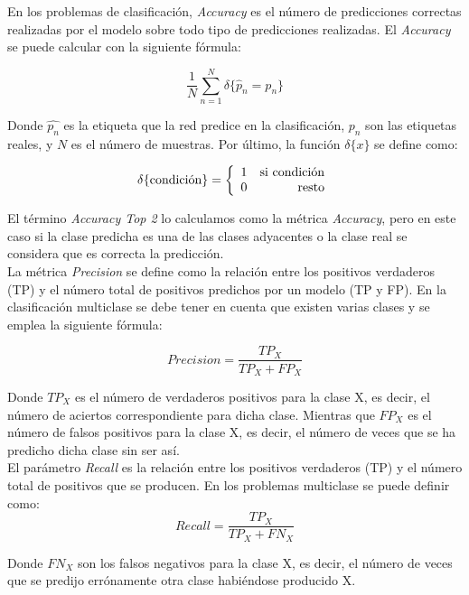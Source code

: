 En los problemas de clasificación, \textit{Accuracy} es el número de predicciones correctas realizadas por el modelo sobre todo tipo de predicciones realizadas. El \textit{Accuracy} se puede calcular con la siguiente fórmula:

$$\frac{1}{N} \sum\limits_{n=1}^N \delta\{ \hat{p}_n = p_n \}$$
\vspace{10pt}

Donde $\hat{p_n}$ es la etiqueta que la red predice en la clasificación, $p_n$ son las etiquetas reales, y $N$ es el número de muestras. Por último, la función $\delta\{x\}$ se define como:

$$\delta\{ \textup{condición}\} = \left\{ \begin{array}{lr} 1 &  \textup{si condición} \\ 0 & \mbox{resto} \end{array} \right.$$
\vspace{10pt}

El término \textit{Accuracy Top 2} lo calculamos como la métrica \textit{Accuracy}, pero en este caso si la clase predicha es una de las clases adyacentes o la clase real se considera que es correcta la predicción.\\

La métrica \textit{Precision} se define como la relación entre los positivos verdaderos (TP) y el número total de positivos predichos por un modelo (TP y FP). En la clasificación multiclase se debe tener en cuenta que existen varias clases y se emplea la siguiente fórmula:

 
\[ Precision = \frac{TP_X}{TP_X + FP_X} \]
\vspace{10pt}

Donde \(TP_X\) es el número de verdaderos positivos para la clase X, es decir, el número de aciertos correspondiente para dicha clase. Mientras que \(FP_X\) es el número de falsos positivos para la clase X, es decir, el número de veces que se ha predicho dicha clase sin ser así.\\


El parámetro \textit{Recall} es la relación entre los positivos verdaderos (TP) y el número total de positivos que se producen. En los problemas multiclase se puede definir como:\\

\[ Recall = \frac{TP_X}{TP_X + FN_X} \]
\vspace{10pt}

Donde \(FN_X\) son los falsos negativos para la clase X, es decir, el número de veces que se predijo
errónamente otra clase habiéndose producido X.\\

